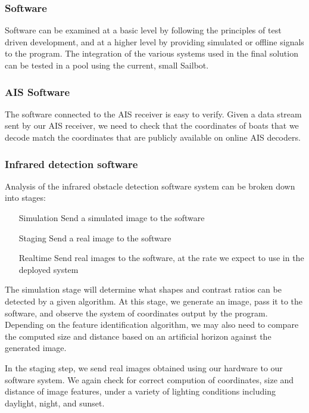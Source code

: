 \subsubsection{\label{sec:method:proposed-analysis:software}Software}
Software can be examined at a basic level by following the principles of test driven development, and at a higher level by providing simulated or offline signals to the program. The integration of the various systems used in the final solution can be tested in a pool using the current, small Sailbot.

\subsubsection{\label{sec:method:proposed-analysis:ais-software}AIS Software}

The software connected to the AIS receiver is easy to verify. Given a data stream sent by our AIS receiver, we need to check that the coordinates of boats that we decode match the coordinates that are publicly available on online AIS decoders.

\subsubsection{\label{sec:method:proposed-analysis:infrared-software}Infrared detection software}

Analysis of the infrared obstacle detection software system can be broken down into stages:
\begin{enumerate}
\item[Simulation] Send a simulated image to the software
\item[Staging] Send a real image to the software
\item[Realtime] Send real images to the software, at the rate we expect to use in the deployed system
\end{enumerate}

The simulation stage will determine what shapes and contrast ratios can be detected by a given algorithm. At this stage, we generate an image, pass it to the software, and observe the system of coordinates output by the program. Depending on the feature identification algorithm, we may also need to compare the computed size and distance based on an artificial horizon against the generated image.

In the staging step, we send real images obtained using our hardware to our software system. We again check for correct compution of coordinates, size and distance of image features, under a variety of lighting conditions including daylight, night, and sunset.

